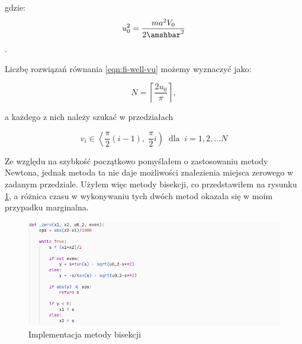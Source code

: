 \documentclass{SGGW-thesis}
\begin{document}
gdzie:
	\[u_0^2=\frac{ma^2V_0}{2\amshbar^2}\].
		
Liczbę rozwiązań równania \ref{eqn:fi-well-vu} możemy wyznaczyć jako:

	\begin{equation}
	N = \left \lceil \frac{2u_0}{\pi} \right \rceil,
	\end{equation}
	
a każdego z nich należy szukać w przedziałach

	\begin{equation}\label{v-range}
	v_i \in \left< \frac{\pi}{2}(i-1), \; \frac{\pi}{2}i \right) \;\; \textrm{dla} \; \; i = 1, 2, ... N
	\end{equation}
	
	Ze względu na szybkość początkowo pomyślałem o zastosowaniu metody Newtona\cite{newton-method}, jednak metoda ta nie daje możliwości znalezienia miejsca zerowego w zadanym przedziale. Użyłem więc metody bisekcji\cite{bisection-method}, co przedstawiłem na rysunku \ref{fig:bisection}, a różnica czasu w wykonywaniu tych dwóch metod okazała się w moim przypadku marginalna.
		
	\begin{figure}[h]
		\includegraphics[width=\textwidth,height=\textheight,keepaspectratio]{bisection.png}
		\caption{Implementacja metody bisekcji}
		\label{fig:bisection}
	\end{figure}
\end{document}
